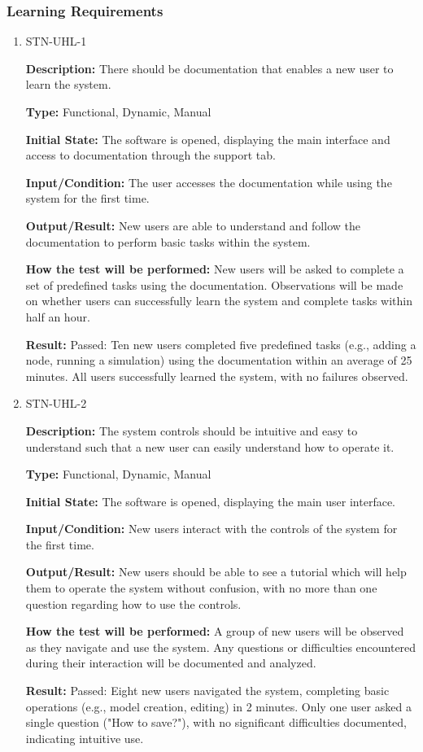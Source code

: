 \documentclass[12pt, titlepage]{article}
\begin{document}
\subsubsection{Learning Requirements}

\begin{enumerate}

\item{STN-UHL-1\\}

\textbf{Description:} There should be documentation that enables a new user to learn the system.

\textbf{Type:} Functional, Dynamic, Manual

\textbf{Initial State:} The software is opened, displaying the main interface and access to documentation through the support tab.

\textbf{Input/Condition:} The user accesses the documentation while using the system for the first time.

\textbf{Output/Result:} New users are able to understand and follow the documentation to perform basic tasks within the system.

\textbf{How the test will be performed:} New users will be asked to complete a set of predefined tasks using the documentation. Observations will be made on whether users can successfully learn the system and complete tasks within half an hour.

\textbf{Result:} Passed: Ten new users completed five predefined tasks (e.g., adding a node, running a simulation) using the documentation within an average of 25 minutes. All users successfully learned the system, with no failures observed.

\item{STN-UHL-2\\}

\textbf{Description:} The system controls should be intuitive and easy to understand such that a new user can easily understand how to operate it.

\textbf{Type:} Functional, Dynamic, Manual

\textbf{Initial State:} The software is opened, displaying the main user interface.

\textbf{Input/Condition:} New users interact with the controls of the system for the first time.

\textbf{Output/Result:} New users should be able to see a tutorial which will help them to operate the system without confusion, with no more than one question regarding how to use the controls.

\textbf{How the test will be performed:} A group of new users will be observed as they navigate and use the system. Any questions or difficulties encountered during their interaction will be documented and analyzed.

\textbf{Result:} Passed: Eight new users navigated the system, completing basic operations (e.g., model creation, editing) in 2 minutes. Only one user asked a single question ("How to save?"), with no significant difficulties documented, indicating intuitive use.

\end{enumerate}
\end{document}
